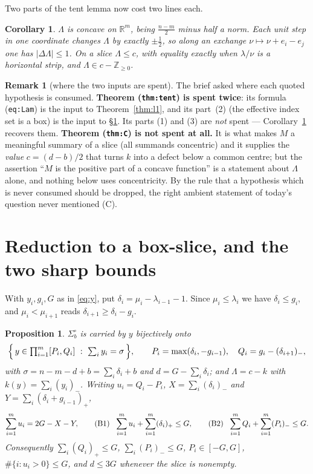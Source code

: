 \documentclass[11pt]{article}
\newtheorem{proposition}[theorem]{Proposition}
\newtheorem{corollary}[theorem]{Corollary}
\theoremstyle{definition}
\newtheorem{remark}[theorem]{Remark}
\newcommand{\Z}{\mathbb Z}
\newcommand{\R}{\mathbb R}
\newcommand{\abs}[1]{\lvert #1\rvert}
\newcommand{\pos}[1]{(#1)_{+}}
\newcommand{\nneg}[1]{(#1)_{-}}
\begin{document}
Two parts of the tent lemma now cost two lines each.

\begin{corollary}\label{cor:tentfree}
$\Lambda$ is concave on $\R^m$, being $\tfrac{n-m}2$ minus half a norm. Each unit step
in one coordinate changes $\Lambda$ by exactly $\pm\tfrac12$, so along an exchange
$\nu\mapsto\nu+e_i-e_j$ one has $\abs{\Delta\Lambda}\le1$. On a slice
$\Lambda\le c$, with equality exactly when $\lambda/\nu$ is a horizontal strip, and
$\Lambda\in c-\Z_{\ge0}$.
\end{corollary}

\begin{remark}[where the two inputs are spent]
The brief asked where each quoted hypothesis is consumed. \textbf{Theorem
(\texttt{thm:tent}) is spent twice}: its formula (\texttt{eq:Lam}) is the input to
Theorem~\ref{thm:l1}, and its part~(2) (the effective index set is a box) is the input to
\S\ref{sec:box}. Its parts (1) and (3) are \emph{not} spent --- Corollary~\ref{cor:tentfree}
recovers them. \textbf{Theorem (\texttt{thm:C}) is not spent at all.} It is what makes
$M$ a meaningful summary of a slice (all summands concentric) and it supplies the
\emph{value} $c=(d-b)/2$ that turns $k$ into a defect below a common centre; but the
assertion ``$M$ is the positive part of a concave function'' is a statement about
$\Lambda$ alone, and nothing below uses concentricity. By the rule that a hypothesis
which is never consumed should be dropped, the right ambient statement of today's
question never mentioned (C).
\end{remark}

\section{Reduction to a box-slice, and the two sharp bounds}\label{sec:box}

With $y_i,g_i,G$ as in \eqref{eq:y}, put $\delta_i=\mu_i-\lambda_{i-1}-1$. Since $\mu_i\le\lambda_i$ we have
$\delta_i\le g_i$, and $\mu_{i}<\mu_{i+1}$ reads $\delta_{i+1}\ge\delta_i-g_i$.

\begin{proposition}\label{prop:box}
$\Sigma^\circ_b$ is carried by $y$ bijectively onto
\[
  \Bigl\{\,y\in\textstyle\prod_{i=1}^m[P_i,Q_i]\ :\ \sum_iy_i=\sigma\,\Bigr\},
  \qquad
  P_i=\max(\delta_i,-g_{i-1}),\quad Q_i=g_i-\nneg{\delta_{i+1}},
\]
with $\sigma=n-m-d+b=\sum_i\delta_i+b$ and $d=G-\sum_i\delta_i$; and
$\Lambda=c-k$ with $k(y)=\sum_i\nneg{y_i}$. Writing $u_i=Q_i-P_i$,
$X=\sum_i\nneg{\delta_i}$ and $Y=\sum_i\pos{\delta_i+g_{i-1}}$,
\begin{equation}\label{eq:B}
  \sum_{i=1}^mu_i=2G-X-Y,\qquad
  \textup{(B1)}\ \ \sum_{i=1}^m u_i+\sum_{i=1}^m\pos{\delta_i}\le G,\qquad
  \textup{(B2)}\ \ \sum_{i=1}^m Q_i+\sum_{i=1}^m\nneg{P_i}\le G .
\end{equation}
Consequently $\sum_i\pos{Q_i}\le G$, $\sum_i\nneg{P_i}\le G$, $P_i\in[-G,G]$,
$\#\{i:u_i>0\}\le G$, and $d\le3G$ whenever the slice is nonempty.
\end{proposition}
\end{document}
